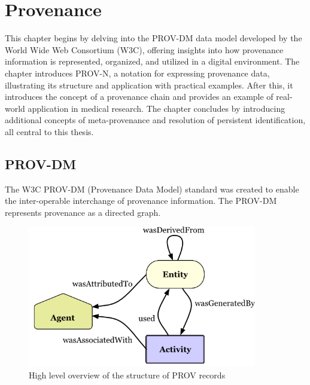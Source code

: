 \documentclass[
  digital,     %
  oneside,     %
  nosansbold,  %
  nocolorbold, %
  lof,         %
  lot,         %
]{fithesis4}
\begin{document}
\chapter{Provenance}
This chapter begins by delving into the PROV-DM data model developed by the World Wide Web Consortium (W3C), offering insights into how provenance information is represented, organized, and utilized in a digital environment. The chapter introduces PROV-N, a notation for expressing provenance data, illustrating its structure and application with practical examples. After this, it introduces the concept of a provenance chain and provides an example of real-world application in medical research. The chapter concludes by introducing additional concepts of meta-provenance and resolution of persistent identification, all central to this thesis.

\section{PROV-DM} \label{provdm}
\shorthandoff{-}
The W3C PROV-DM (Provenance Data Model) standard \cite{provdm} was created to enable the inter-operable interchange of provenance information. The PROV-DM represents provenance as a directed graph. 

\begin{figure}[htbp]
  \begin{center}
    \includegraphics[width=10cm]{fithesis/images/provdm-basics.png}
  \end{center}
  \caption{High level overview of the structure of PROV records \cite{provdm-basics}}
  \label{fig:provdm-basics}
\end{figure}
\end{document}
